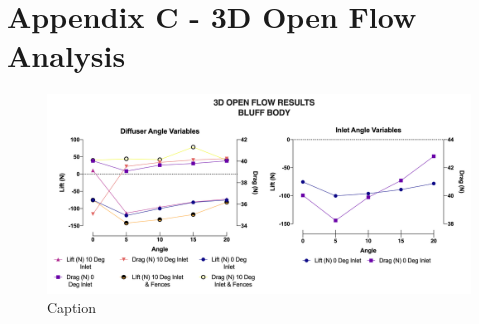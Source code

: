 \flushleft
\section*{Appendix C - 3D Open Flow Analysis} 

\begin{figure}[!h]
    \centering
    \includegraphics[scale=0.5]{Figures/Graph/3D_OF.png}
    \caption{Caption}
    \label{fig:my_label}
\end{figure}